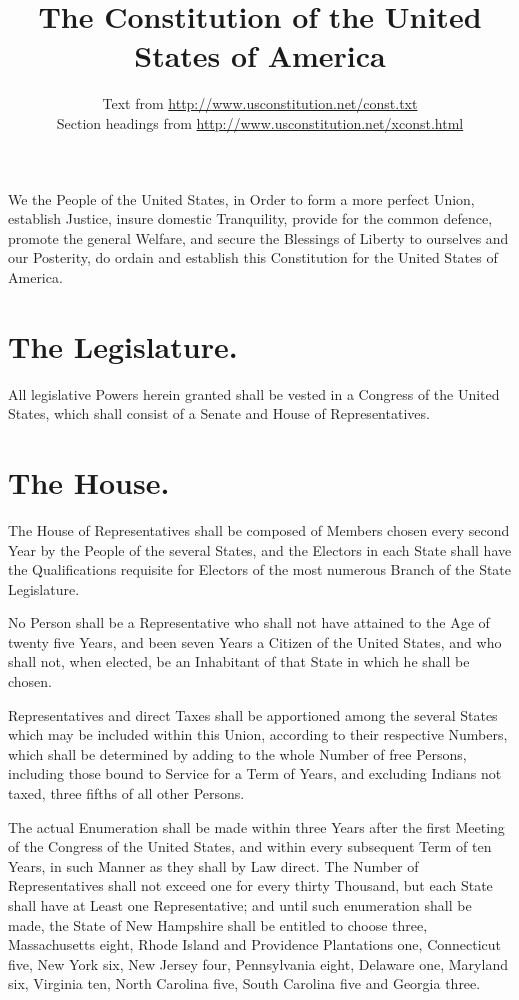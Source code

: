 \documentclass[12pt]{constitution}
\begin{document}
\title{The Constitution of the United States of America}
\author{Text from \url{http://www.usconstitution.net/const.txt}\\
Section headings from \url{http://www.usconstitution.net/xconst.html}}
\date{}
\maketitle
\setcounter{tocdepth}{0}
\tableofcontents
\newpage

We the People of the United States, in Order to form a more perfect Union,
establish Justice, insure domestic Tranquility, provide for the common
defence, promote the general Welfare, and secure the Blessings of Liberty to
ourselves and our Posterity, do ordain and establish this Constitution for the
United States of America.




\section{The Legislature.}
All legislative Powers herein granted shall be vested in a Congress of the
United States, which shall consist of a Senate and House of Representatives.


\section{The House.}
The House of Representatives shall be composed of Members chosen every second
Year by the People of the several States, and the Electors in each State shall
have the Qualifications requisite for Electors of the most numerous Branch of
the State Legislature.

No Person shall be a Representative who shall not have attained to the Age of
twenty five Years, and been seven Years a Citizen of the United States, and who
shall not, when elected, be an Inhabitant of that State in which he shall be
chosen.

Representatives and direct Taxes shall be apportioned among the several States
which may be included within this Union, according to their respective Numbers,
which shall be determined by adding to the whole Number of free Persons,
including those bound to Service for a Term of Years, and excluding Indians not
taxed, three fifths of all other Persons.

The actual Enumeration shall be made within three Years after the first Meeting
of the Congress of the United States, and within every subsequent Term of ten
Years, in such Manner as they shall by Law direct. The Number of
Representatives shall not exceed one for every thirty Thousand, but each State
shall have at Least one Representative; and until such enumeration shall be
made, the State of New Hampshire shall be entitled to choose three,
Massachusetts eight, Rhode Island and Providence Plantations one, Connecticut
five, New York six, New Jersey four, Pennsylvania eight, Delaware one, Maryland
six, Virginia ten, North Carolina five, South Carolina five and Georgia three.
\end{document}
